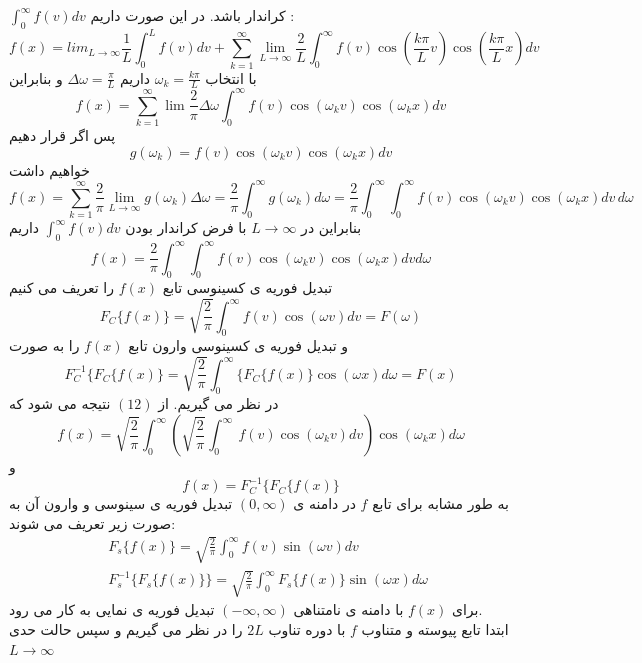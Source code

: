 $\int_0^\infty{f(v)dv}$
کراندار باشد. در این صورت داریم :
\[
f(x)=lim_{L\to\infty}{\frac{1}{L}\int_0^L{f(v)dv}}+\sum_{k=1}^{\infty} {\lim _{L\to{\infty}} \frac{2}{L} \int_{0}^{\infty} {f(v) \cos \left(\frac{k \pi}{L} v\right) \cos \left(\frac{k \pi}{L} x\right) d v}}
\]
با انتخاب
$\omega_k=\frac{k\pi}{L}$
داریم
$\Delta\omega=\frac{\pi}{L}$
و بنابراین
\[
f(x)=\sum_{k=1}^{\infty} \lim \frac{2} {\pi} \Delta \omega \int_{0}^{\infty} f(v) \cos \left( \omega_{k} v\right)\cos \left( \omega_{k} x\right)  d v
\]
پس اگر قرار دهیم
\[
g\left(\omega_k\right)=f(v) \cos \left( \omega_{k} v\right)\cos \left( \omega_{k} x\right)  d v
\]
خواهیم داشت
\[
f(x)=\sum_{k=1}^{\infty}\frac{2} {\pi} \lim_{L\to{\infty}} g( \omega_{k} )  \Delta \omega =\frac{2} {\pi} \int_{0}^{{\infty}} g( \omega_{k} )  d \omega=\frac{2} {\pi} \int_{0}^{{\infty}}\int_{0}^{{\infty}} f(v) \cos ( \omega_{k} v)\cos ( \omega_{k} x)  d v\, d\omega
\]
بنابراین در 
$L\to\infty$
با فرض کراندار بودن
$\int_0^\infty{f(v)dv}$
داریم
\begin{equation}
	f(x)=\frac{2} {\pi} \int_{0}^{{\infty}}\int_{0}^{{\infty}} f(v) \cos ( \omega_{k} v)\cos ( \omega_{k} x)  d v d\omega
\end{equation}
تبدیل فوریه ی کسینوسی تابع
$f(x)$
را تعریف می کنیم
\[
F_{C}\{f(x)\}=\sqrt{\frac{2}{\pi}} \int_{0}^{\infty} f(v) \cos (\omega v) d v=F(\omega)
\]
و تبدیل فوریه ی کسینوسی وارون تابع 
$f(x)$
را به صورت
\[
F^{-1}_{C}\{F_{C}\{f(x)\}=\sqrt{\frac{2}{\pi}} \int_{0}^{\infty}\{F_{C}\{f(x)\} \cos (\omega x) d \omega=F(x)
\]
در نظر می گیریم. از
$(12)$
نتیجه می شود که
\[
f(x)=\sqrt{\frac{2}{\pi}} \int_{0}^{\infty}(\sqrt{\frac{2}{\pi}} \int_{0}^{\infty}\ f(v) \cos ( \omega_{k} v)  d v)\cos ( \omega_{k} x) d\omega
\]
و
\[
f(x)=F^{-1}_{C}\{F_{C}\{f(x)\}
\]
به طور مشابه برای تابع 
$f$
در دامنه ی
$(0,\infty)$
تبدیل فوریه ی سینوسی و وارون آن به صورت زیر تعریف می شوند:
\begin{equation*}
	\begin{aligned}
		{} &\
		F_{s}\{f(x)\}=\sqrt{\frac{2}{\pi}} \int_{0}^{\infty} f(v) \sin ( \omega v)  d v
		\\ &\
		F^{-1}_{s}\{F_{s}\{f(x)\}\}=\sqrt{\frac{2}{\pi}} \int_{0}^{\infty} F_{s}\{f(x)\} \sin ( \omega x)  d\omega
	\end{aligned}
\end{equation*}
برای 
$f(x)$
با دامنه ی نامتناهی
$(-\infty,\infty)$
تبدیل فوریه ی نمایی به کار می رود.\\
ابتدا تابع پیوسته و متناوب 
$f$
با دوره تناوب 
$2L$
را در نظر می گیریم و سپس حالت حدی
$L\to\infty$
